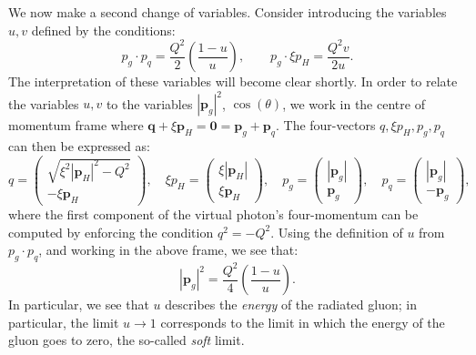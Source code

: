 \documentclass[withindex,glossary]{cam-thesis}
\renewcommand{\vec}[1]{\textbf{#1}} %
\begin{document}
We now make a second change of variables. Consider introducing the variables $u,v$ defined by the conditions:
\begin{equation}
\label{eq:soft_and_collinear_definitions}
p_g \cdot p_q = \frac{Q^2}{2} \left( \frac{1-u}{u} \right), \qquad p_g \cdot \xi p_H = \frac{Q^2 v}{2u}.
\end{equation}
The interpretation of these variables will become clear shortly. In order to relate the variables $u,v$ to the variables $|\vec{p}_g|^2$, $\cos(\theta)$, we work in the centre of momentum frame where $\vec{q} + \xi \vec{p}_H = \vec{0} = \vec{p}_g + \vec{p}_q$. The four-vectors $q, \xi p_H, p_g, p_q$ can then be expressed as:
\begin{equation}
q = \begin{pmatrix} \sqrt{\xi^2 |\vec{p}_H|^2 - Q^2} \\ -\xi \vec{p}_H \end{pmatrix}, \quad \xi p_H = \begin{pmatrix} \xi |\vec{p}_H| \\ \xi \vec{p}_H  \end{pmatrix}, \quad p_g = \begin{pmatrix} |\vec{p}_g| \\ \vec{p}_g \end{pmatrix}, \quad p_q = \begin{pmatrix} |\vec{p}_g| \\ -\vec{p}_g \end{pmatrix},
\end{equation}
where the first component of the virtual photon's four-momentum can be computed by enforcing the condition $q^2 = -Q^2$. Using the definition of $u$ from $p_g \cdot p_q$, and working in the above frame, we see that:
\begin{equation}
|\vec{p}_g|^2 = \frac{Q^2}{4} \left( \frac{1-u}{u} \right).
\end{equation}
In particular, we see that $u$ describes the \textit{energy} of the radiated gluon; in particular, the limit $u \rightarrow 1$ corresponds to the limit in which the energy of the gluon goes to zero, the so-called \textit{soft} limit. 
\end{document}
